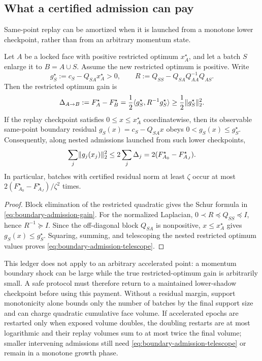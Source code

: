 \subsection{What a certified admission can pay}

Same-point replay can be amortized when it is launched from a monotone lower
checkpoint, rather than from an arbitrary momentum state.

\begin{lemma}
\label{lem:boundary-admission-gain}
Let $A$ be a locked face with positive restricted optimum $x_A^\star$, and
let a batch $S$ enlarge it to $B=A\cup S$.  Assume the new restricted optimum
is positive.  Write
\begin{equation*}
 g_S^\star:=c_S-Q_{SA}x_A^\star>0,
 \qquad
 R:=Q_{SS}-Q_{SA}Q_{AA}^{-1}Q_{AS}.
\end{equation*}
Then the restricted optimum gain is
\begin{equation}
 \Delta_{A\to B}
 :=F_A^\star-F_B^\star
 =\frac12\langle g_S^\star,R^{-1}g_S^\star\rangle
 \geq\frac12\lVert g_S^\star\rVert_2^2.
 \label{eq:boundary-admission-gain}
\end{equation}
If the replay checkpoint satisfies $0\leq x\leq x_A^\star$ coordinatewise,
then its observable same-point boundary residual
$g_S(x)=c_S-Q_{SA}x$ obeys $0<g_S(x)\leq g_S^\star$.  Consequently, along
nested admissions launched from such lower checkpoints,
\begin{equation}
 \sum_j\lVert g_j(x_j)\rVert_2^2
 \leq2\sum_j\Delta_j
 =2(F_{A_0}^\star-F_{A_J}^\star).
 \label{eq:boundary-admission-telescope}
\end{equation}
In particular, batches with certified residual norm at least $\zeta$ occur at
most $2(F_{A_0}^\star-F_{A_J}^\star)/\zeta^2$ times.
\end{lemma}

\begin{proof}
Block elimination of the restricted quadratic gives the Schur formula in
\cref{eq:boundary-admission-gain}.  For the normalized Laplacian,
$0\prec R\preceq Q_{SS}\preceq I$, hence $R^{-1}\succeq I$.  Since the
off-diagonal block $Q_{SA}$ is nonpositive, $x\leq x_A^\star$ gives
$g_S(x)\leq g_S^\star$.  Squaring, summing, and telescoping the nested
restricted optimum values proves \cref{eq:boundary-admission-telescope}.
\end{proof}

This ledger does not apply to an arbitrary accelerated point: a momentum
boundary shock can be large while the true restricted-optimum gain is
arbitrarily small.  A safe protocol must therefore return to a maintained
lower-shadow checkpoint before using this payment.  Without a residual
margin, support monotonicity alone bounds only the number of batches by the
final support size and can charge quadratic cumulative face volume.  If
accelerated epochs are restarted only when exposed volume doubles, the
doubling restarts are at most logarithmic and their replay volumes sum to at
most twice the final volume; smaller intervening admissions still need
\cref{eq:boundary-admission-telescope} or remain in a monotone growth phase.

